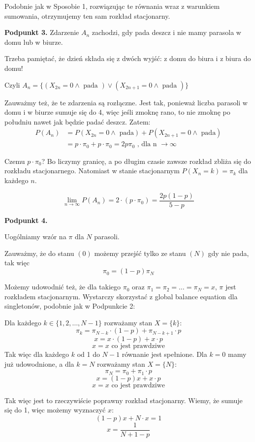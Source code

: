 Podobnie jak w Sposobie 1, rozwiązując te równania wraz z warunkiem sumowania, otrzymujemy ten sam rozkład stacjonarny.

\textbf{Podpunkt 3.}
Zdarzenie \(A_n\) zachodzi, gdy pada deszcz i nie mamy parasola w domu lub w biurze.

Trzeba pamiętać, że dzień składa się z dwóch wyjść: z domu do biura i z biura do domu!

Czyli \(A_n = \{(X_{2n} = 0 \land \text{ pada }) \lor (X_{2n+1} = 0 \land \text{ pada })\}\)

Zauważmy też, że te zdarzenia są rozłączne.
Jest tak, ponieważ liczba parasoli w domu i w biurze sumuje się do 4, więc jeśli zmoknę rano, to nie zmoknę po południu nawet jak będzie padać deszcz.
Zatem:
\begin{align*}
	P(A_n) & = P(X_{2n} = 0 \land \text{ pada}) + P(X_{2n+1} = 0 \land \text{ pada}) \\
	       & = p \cdot \pi_0 + p \cdot \pi_0 = 2p \pi_0 \text{ , dla n } \to \infty
\end{align*}

Czemu \(p \cdot \pi_0\)? Bo liczymy granicę, a po długim czasie zawsze rozkład zbliża się do rozkładu stacjonarnego.
Natomiast w stanie stacjonarnym \(P(X_n = k) = \pi_k\) dla każdego \(n\).


\[
	\lim_{n \to \infty} P(A_n) = 2 \cdot (p \cdot \pi_0) = \frac{2p(1 - p)}{5 - p}
\]


\textbf{Podpunkt 4.}

Uogólniamy wzór na \(\pi\) dla \(N\) parasoli.

Zauważmy, że do stanu \((0)\) możemy przejść tylko ze stanu \((N)\) gdy nie pada, tak więc \[\pi_0 = (1-p)\pi_N\]

Możemy udowodnić też, że dla takiego \(\pi_0\) oraz \(\pi_1 = \pi_2 = \ldots = \pi_N = x\), \(\pi\) jest rozkładem stacjonarnym. Wystarczy skorzystać z global balance equation dla singletonów, podobnie jak w Podpunkcie 2:

Dla każdego \(k \in \{1, 2, \ldots, N-1\}\)
rozważamy stan \(X = \{k\}\):
\[\pi_k = \pi_{N - k} \cdot (1 - p) + \pi _{N - k + 1} \cdot p\]
\[x = x \cdot (1 - p) + x \cdot p\]
\[x = x \text{ co jest prawdziwe}\]
Tak więc dla każdego \(k\) od 1 do \(N-1\) równanie jest spełnione.
Dla \(k = 0\) mamy już udowodnione, a dla \(k = N\) rozważamy stan \(X = \{N\}\):
\[\pi_N = \pi_0 + \pi_1 \cdot p\]
\[x = (1 - p)x + x \cdot p\]
\[x = x \text{ co jest prawdziwe}\]

Tak więc jest to rzeczywiście poprawny rozkład stacjonarny.
Wiemy, że sumuje się do 1, więc możemy wyznaczyć \(x\):
\[(1 - p)x + N \cdot x = 1\]
\[x = \frac{1}{N + 1 - p}\]

